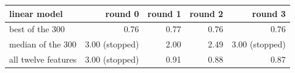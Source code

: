 \begin{tabular}{lrrrr}
\toprule
linear model & round 0 & round 1 & round 2 & round 3 \\
\midrule
best of the 300 & 0.76 & 0.77 & 0.76 & 0.76 \\
median of the 300 & 3.00 (stopped) & 2.00 & 2.49 & 3.00 (stopped) \\
all twelve features & 3.00 (stopped) & 0.91 & 0.88 & 0.87 \\
\bottomrule
\end{tabular}
